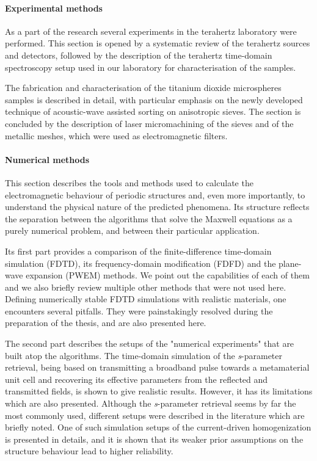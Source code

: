 \paragraph{Experimental methods} %
As a part of the research several experiments in the terahertz laboratory were performed. This section is opened by a systematic review of the terahertz sources and detectors, followed by the description of the terahertz time-domain spectroscopy setup used in our laboratory for characterisation of the samples. 

The fabrication and characterisation of the titanium dioxide microspheres samples is described in detail, with particular emphasis on the newly developed technique of acoustic-wave assisted sorting on anisotropic sieves. The section is concluded by the description of laser micromachining of the sieves and of the metallic meshes, which were used as electromagnetic filters.

\paragraph{Numerical methods} %
This section describes the tools and methods used to calculate the electromagnetic behaviour of periodic structures and, even more importantly, to understand the physical nature of the predicted phenomena. Its structure reflects the separation between the algorithms that solve the Maxwell equations as a purely numerical problem, and between their particular application.

Its first part provides a comparison of the finite-difference time-domain simulation (FDTD), its frequency-domain modification (FDFD) 
and the plane-wave expansion (PWEM) methods.
We point out the capabilities of each of them and we also briefly review multiple other methods that were not used here. %
Defining numerically stable FDTD simulations with realistic materials, one encounters several pitfalls. They were painstakingly resolved during the preparation of the thesis, and are also presented here.

The second part describes the setups of the "numerical experiments" that are built atop the algorithms. 
The time-domain simulation of the \textit{s}-parameter retrieval, being based on transmitting a broadband pulse towards a metamaterial unit cell and recovering its effective parameters from the reflected and transmitted fields, is shown to give realistic results. However, it has its limitations which are also presented. Although the \textit{s}-parameter retrieval seems by far the most commonly used, different setups were described in the literature which are briefly noted.
One of such simulation setups of the current-driven homogenization is presented in details, and it is shown that its weaker prior assumptions on the structure behaviour lead to higher reliability.
